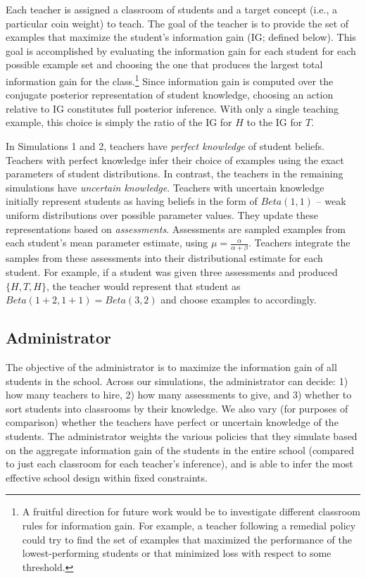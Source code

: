 \documentclass[10pt, letterpaper]{article}
\begin{document}
Each teacher is assigned a classroom of students and a target concept
(i.e., a particular coin weight) to teach. The goal of the teacher is to
provide the set of examples that maximize the student's information gain
(IG; defined below). This goal is accomplished by evaluating the
information gain for each student for each possible example set and
choosing the one that produces the largest total information gain for
the class.\footnote{A fruitful direction for future work would be to
  investigate different classroom rules for information gain. For
  example, a teacher following a remedial policy could try to find the
  set of examples that maximized the performance of the
  lowest-performing students or that minimized loss with respect to some
  threshold.} Since information gain is computed over the conjugate
posterior representation of student knowledge, choosing an action
relative to IG constitutes full posterior inference. With only a single
teaching example, this choice is simply the ratio of the IG for \(H\) to
the IG for \(T\).

In Simulations 1 and 2, teachers have \emph{perfect knowledge} of
student beliefs. Teachers with perfect knowledge infer their choice of
examples using the exact parameters of student distributions. In
contrast, the teachers in the remaining simulations have \emph{uncertain
knowledge}. Teachers with uncertain knowledge initially represent
students as having beliefs in the form of \(Beta(1,1)\) -- weak uniform
distributions over possible parameter values. They update these
representations based on \emph{assessments}. Assessments are sampled
examples from each student's mean parameter estimate, using
\(\mu = \frac{\alpha}{\alpha + \beta}\). Teachers integrate the samples
from these assessments into their distributional estimate for each
student. For example, if a student was given three assessments and
produced \(\{H, T, H\}\), the teacher would represent that student as
\(Beta(1+2,1+1) = Beta(3,2)\) and choose examples to accordingly.

\subsection{Administrator}\label{administrator}

The objective of the administrator is to maximize the information gain
of all students in the school. Across our simulations, the administrator
can decide: 1) how many teachers to hire, 2) how many assessments to
give, and 3) whether to sort students into classrooms by their
knowledge. We also vary (for purposes of comparison) whether the
teachers have perfect or uncertain knowledge of the students. The
administrator weights the various policies that they simulate based on
the aggregate information gain of the students in the entire school
(compared to just each classroom for each teacher's inference), and is
able to infer the most effective school design within fixed constraints.
\end{document}
